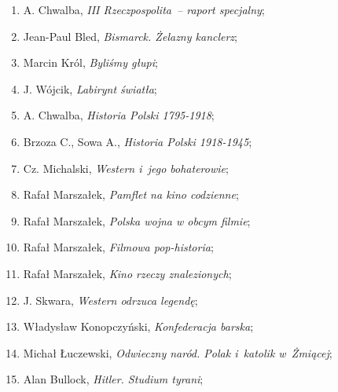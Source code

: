 \documentclass[a4paper,11pt]{article}
\begin{document}
\begin{enumerate}
\item A. Chwalba, \textit{III Rzeczpospolita~-- raport specjalny};



\item Jean-Paul Bled, \textit{Bismarck. Żelazny kanclerz};



\item Marcin Król, \textit{Byliśmy głupi};



\item J. Wójcik, \textit{Labirynt światła};



\item A. Chwalba, \textit{Historia Polski 1795-1918};



\item Brzoza C., Sowa A., \textit{Historia Polski 1918-1945};



\item Cz. Michalski, \textit{Western i~jego bohaterowie};



\item Rafał Marszałek, \textit{Pamflet na kino codzienne};



\item Rafał Marszałek, \textit{Polska wojna w obcym filmie};



\item Rafał Marszałek, \textit{Filmowa pop-historia};



\item Rafał Marszałek, \textit{Kino rzeczy znalezionych};



\item J. Skwara, \textit{Western odrzuca legendę};



\item Władysław Konopczyński, \textit{Konfederacja barska};



\item Michał Łuczewski, \textit{Odwieczny naród. Polak i~katolik
    w~Żmiącej};



\item Alan Bullock, \textit{Hitler. Studium tyrani};




\end{enumerate}
\end{document}
